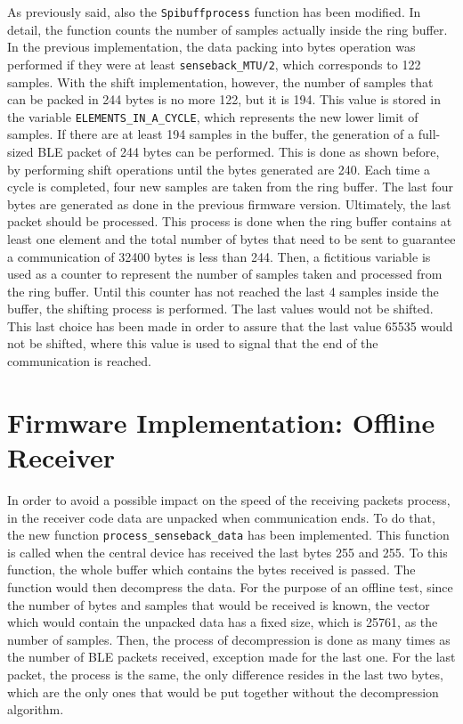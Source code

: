 \documentclass{Configuration_Files/PoliMi3i_thesis}
\begin{document}
As previously said, also the \texttt{Spibuffprocess} function has been modified. In detail, the function counts the number of samples actually inside the ring buffer. In the previous implementation, the data packing into bytes operation was performed if they were at least \texttt{senseback\_MTU/2}, which corresponds to 122 samples. With the shift implementation, however, the number of samples that can be packed in 244 bytes is no more 122, but it is 194. This value is stored in the variable \texttt{ELEMENTS\_IN\_A\_CYCLE}, which represents the new lower limit of samples. If there are at least 194 samples in the buffer, the generation of a full-sized BLE packet of 244 bytes can be performed. This is done as shown before, by performing shift operations until the bytes generated are 240. Each time a cycle is completed, four new samples are taken from the ring buffer. The last four bytes are generated as done in the previous firmware version. Ultimately, the last packet should be processed. This process is done when the ring buffer contains at least one element and the total number of bytes that need to be sent to guarantee a communication of 32400 bytes is less than 244. Then, a fictitious variable is used as a counter to represent the number of samples taken and processed from the ring buffer. Until this counter has not reached the last 4 samples inside the buffer, the shifting process is performed. The last values would not be shifted. This last choice has been made in order to assure that the last value 65535 would not be shifted, where this value is used to signal that the end of the communication is reached. 

\section{Firmware Implementation: Offline Receiver}

In order to avoid a possible impact on the speed of the receiving packets process, in the receiver code data are unpacked when communication ends. To do that, the new function \texttt{process\_senseback\_data} has been implemented. This function is called when the central device has received the last bytes 255 and 255. To this function, the whole buffer which contains the bytes received is passed. The function would then decompress the data. For the purpose of an offline test, since the number of bytes and samples that would be received is known, the vector which would contain the unpacked data has a fixed size, which is 25761, as the number of samples. Then, the process of decompression is done as many times as the number of BLE packets received, exception made for the last one. For the last packet, the process is the same, the only difference resides in the last two bytes, which are the only ones that would be put together without the decompression algorithm.
\end{document}
